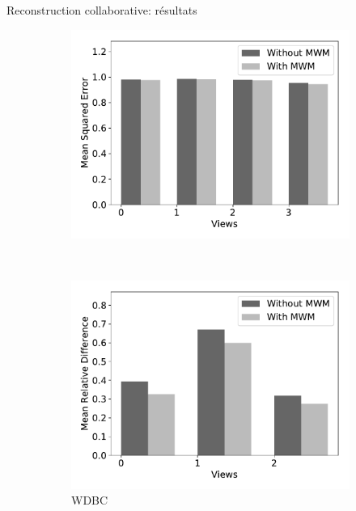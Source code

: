 \documentclass[hyperref={pdfpagelabels=false}]{beamer}
\begin{document}
\begin{frame}{Reconstruction collaborative: résultats}
\begin{figure}[!h]
\begin{subfigure}[c]{0.32\textwidth}
                \includegraphics[scale=.21]{mse_madelon}
            \end{subfigure}
            \\
            \begin{subfigure}[c]{0.32\textwidth}
                \includegraphics[scale=.21]{mrd_wdbc}
                \caption{WDBC}
            \end{subfigure}
            \begin{subfigure}[c]{0.32\textwidth}

\end{subfigure}
\end{figure}
\end{frame}
\end{document}
